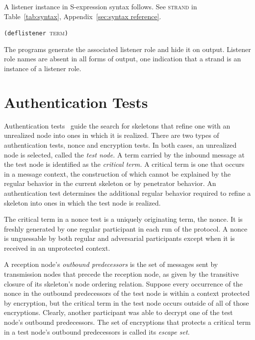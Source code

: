 \documentclass[12pt]{article}
\begin{document}
A listener instance in S-expression syntax follows.  See
\textsc{strand} in Table~\ref{tab:syntax}, Appendix~\ref{sec:syntax
  reference}.
\begin{center}
\texttt{(deflistener }\textsc{term}\texttt{)}
\end{center}
The {\cpsa} programs generate the associated listener role and hide
it on output.  Listener role names are absent in all forms of output,
one indication that a strand is an instance of a listener role.

\section{Authentication Tests}\label{sec:authentication tests}

Authentication tests~\cite{GuttmanThayer02} guide the search for
skeletons that refine one with an unrealized node into ones in which
it is realized.  There are two types of authentication tests, nonce
and encryption tests.  In both cases, an unrealized node is selected,
called the \emph{test node.}  A term carried by the
inbound message at the test node is identified as the \emph{critical term.}  A critical term is one that occurs in a
message context, the construction of which cannot be explained by the
regular behavior in the current skeleton or by penetrator behavior.
An authentication test determines the additional regular behavior
required to refine a skeleton into ones in which the test node is
realized.

The critical term in a nonce test is a uniquely originating term, the
nonce.  It is freshly generated by one regular participant in each run
of the protocol.  A nonce is unguessable by both regular and
adversarial participants except when it is received in an unprotected
context.

A reception node's \emph{outbound
  predecessors} is the set of messages sent by transmission nodes that
precede the reception node, as given by the transitive closure of its
skeleton's node ordering relation.  Suppose every occurrence of the
nonce in the outbound predecessors of the test node is within a
context protected by encryption, but the critical term in the test
node occurs outside of all of those encryptions.  Clearly, another
participant was able to decrypt one of the test node's outbound
predecessors.  The set of encryptions that protects a critical term
in a test node's outbound predecessors is called its \emph{escape set.}
\end{document}
